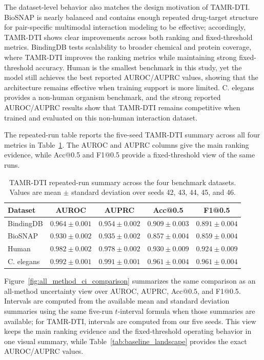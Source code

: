 The dataset-level behavior also matches the design motivation of TAMR-DTI.
BioSNAP is nearly balanced and contains enough repeated drug-target structure
for pair-specific multimodal interaction modeling to be effective; accordingly,
TAMR-DTI shows clear improvements across both ranking and fixed-threshold
metrics. BindingDB tests scalability to broader chemical and protein coverage,
where TAMR-DTI improves the ranking metrics while maintaining strong
fixed-threshold accuracy. Human is the smallest benchmark in this study, yet the
model still achieves the best reported AUROC/AUPRC values, showing that the
architecture remains effective when training support is more limited. C. elegans
provides a non-human organism benchmark, and the strong reported AUROC/AUPRC
results show that TAMR-DTI remains competitive when trained and evaluated on
this non-human interaction dataset.

The repeated-run table reports the five-seed TAMR-DTI summary across all four
metrics in Table~\ref{tab:tamr_main_summary}. The AUROC and AUPRC columns give
the main ranking evidence, while Acc@0.5 and F1@0.5 provide a fixed-threshold
view of the same runs.

\begin{table}[!htbp]
\caption{TAMR-DTI repeated-run summary across the four benchmark datasets. Values are mean $\pm$ standard deviation over seeds 42, 43, 44, 45, and 46.}
\label{tab:tamr_main_summary}
\begin{center}
\scriptsize
\setlength{\tabcolsep}{5pt}
\begin{tabular}{lcccc}
\toprule
Dataset & AUROC & AUPRC & Acc@0.5 & F1@0.5 \\
\midrule
BindingDB & \textbf{$0.964\pm0.001$} & \textbf{$0.954\pm0.002$} & \textbf{$0.909\pm0.003$} & \textbf{$0.891\pm0.004$} \\
BioSNAP & \textbf{$0.930\pm0.002$} & \textbf{$0.935\pm0.002$} & \textbf{$0.857\pm0.004$} & \textbf{$0.859\pm0.004$} \\
Human & \textbf{$0.982\pm0.002$} & \textbf{$0.978\pm0.002$} & \textbf{$0.930\pm0.009$} & \textbf{$0.924\pm0.009$} \\
C. elegans & \textbf{$0.992\pm0.001$} & \textbf{$0.991\pm0.001$} & \textbf{$0.961\pm0.004$} & \textbf{$0.961\pm0.004$} \\
\bottomrule
\end{tabular}
\end{center}
\end{table}

Figure~\ref{fig:all_method_ci_comparison} summarizes the same comparison as an
all-method uncertainty view over AUROC, AUPRC, Acc@0.5, and F1@0.5. Intervals
are computed from the available mean and standard deviation summaries using the
same five-run $t$-interval formula when those summaries are available; for
TAMR-DTI, intervals are computed from our five seeds. This view keeps the main
ranking evidence and the fixed-threshold operating behavior in one visual
summary, while Table~\ref{tab:baseline_landscape} provides the exact
AUROC/AUPRC values.

